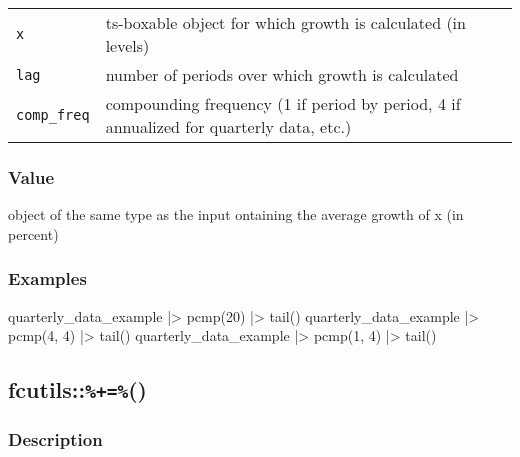 \documentclass[
  letterpaper,
  DIV=11,
  numbers=noendperiod]{scrreport}
\newenvironment{Shaded}{\begin{snugshade}}{\end{snugshade}}
\newcommand{\DecValTok}[1]{\textcolor[rgb]{0.68,0.00,0.00}{#1}}
\newcommand{\FunctionTok}[1]{\textcolor[rgb]{0.28,0.35,0.67}{#1}}
\newcommand{\NormalTok}[1]{\textcolor[rgb]{0.00,0.23,0.31}{#1}}
\newcommand{\SpecialCharTok}[1]{\textcolor[rgb]{0.37,0.37,0.37}{#1}}
\begin{document}
\begin{longtable}[]{@{}ll@{}}
\toprule\noalign{}
\endhead
\bottomrule\noalign{}
\endlastfoot
\texttt{x} & ts-boxable object for which growth is calculated (in
levels) \\
\texttt{lag} & number of periods over which growth is calculated \\
\texttt{comp\_freq} & compounding frequency (1 if period by period, 4 if
annualized for quarterly data, etc.) \\
\end{longtable}

\subsubsection{Value}\label{value-48}

object of the same type as the input ontaining the average growth of x
(in percent)

\subsubsection{Examples}\label{examples-48}

\begin{Shaded}
\begin{Highlighting}[]
\NormalTok{quarterly\_data\_example }\SpecialCharTok{|\textgreater{}}
  \FunctionTok{pcmp}\NormalTok{(}\DecValTok{20}\NormalTok{) }\SpecialCharTok{|\textgreater{}}
  \FunctionTok{tail}\NormalTok{()}
\NormalTok{quarterly\_data\_example }\SpecialCharTok{|\textgreater{}}
  \FunctionTok{pcmp}\NormalTok{(}\DecValTok{4}\NormalTok{, }\DecValTok{4}\NormalTok{) }\SpecialCharTok{|\textgreater{}}
  \FunctionTok{tail}\NormalTok{()}
\NormalTok{quarterly\_data\_example }\SpecialCharTok{|\textgreater{}}
  \FunctionTok{pcmp}\NormalTok{(}\DecValTok{1}\NormalTok{, }\DecValTok{4}\NormalTok{) }\SpecialCharTok{|\textgreater{}}
  \FunctionTok{tail}\NormalTok{()}
\end{Highlighting}
\end{Shaded}

\subsection{\texorpdfstring{fcutils::\texttt{\%+=\%}()}{fcutils::\%+=\%()}}\label{fcutils}

\subsubsection{Description}\label{description-49}
\end{document}
